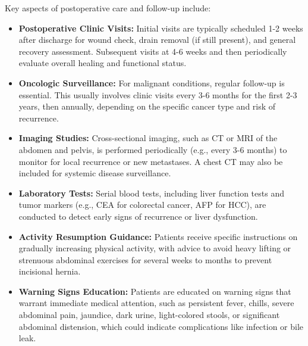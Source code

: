 Key aspects of postoperative care and follow-up include:
\begin{itemize}
  \item \textbf{Postoperative Clinic Visits:} Initial visits are typically scheduled 1-2 weeks after discharge for wound check, drain removal (if still present), and general recovery assessment. Subsequent visits at 4-6 weeks and then periodically evaluate overall healing and functional status.
  \item \textbf{Oncologic Surveillance:} For malignant conditions, regular follow-up is essential. This usually involves clinic visits every 3-6 months for the first 2-3 years, then annually, depending on the specific cancer type and risk of recurrence.
  \item \textbf{Imaging Studies:} Cross-sectional imaging, such as CT or MRI of the abdomen and pelvis, is performed periodically (e.g., every 3-6 months) to monitor for local recurrence or new metastases. A chest CT may also be included for systemic disease surveillance.
  \item \textbf{Laboratory Tests:} Serial blood tests, including liver function tests and tumor markers (e.g., CEA for colorectal cancer, AFP for HCC), are conducted to detect early signs of recurrence or liver dysfunction.
  \item \textbf{Activity Resumption Guidance:} Patients receive specific instructions on gradually increasing physical activity, with advice to avoid heavy lifting or strenuous abdominal exercises for several weeks to months to prevent incisional hernia.
  \item \textbf{Warning Signs Education:} Patients are educated on warning signs that warrant immediate medical attention, such as persistent fever, chills, severe abdominal pain, jaundice, dark urine, light-colored stools, or significant abdominal distension, which could indicate complications like infection or bile leak.
\end{itemize}

